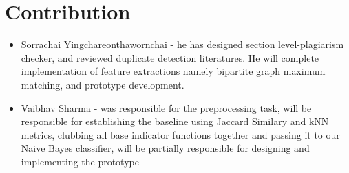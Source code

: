 \documentclass{article}
\begin{document}
\section{Contribution}
\begin{itemize}
\item Sorrachai Yingchareonthawornchai - he has designed section
  level-plagiarism checker, and reviewed duplicate detection
  literatures. He will complete implementation of feature extractions
  namely bipartite graph maximum matching, and prototype development.
\item Vaibhav Sharma - was responsible for the preprocessing task, will be responsible for establishing the baseline using Jaccard Similary and kNN metrics, clubbing all base indicator functions together and passing it to our Naive Bayes classifier, will be partially responsible for designing and implementing the prototype
\end{itemize}
\end{document}
